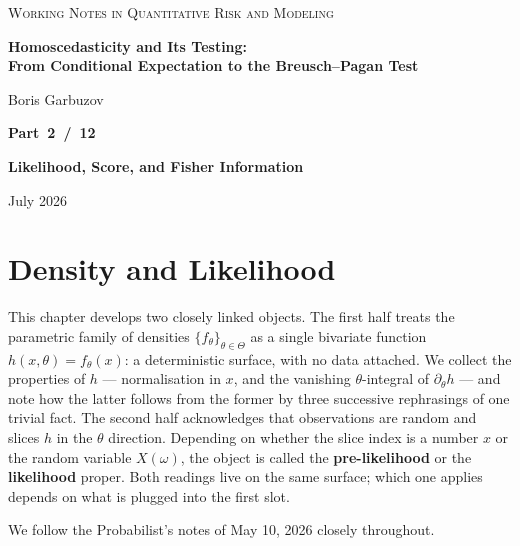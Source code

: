 \documentclass[a4paper,oneside,12pt]{extarticle}
\theoremstyle{plain}
\theoremstyle{definition}
\theoremstyle{remark}
\begin{document}
\begin{titlepage}
\begin{center}

{\footnotesize\scshape\color{gray}
Working Notes in Quantitative Risk and Modeling
}

\vfill

{\LARGE\bfseries Homoscedasticity and Its Testing:\\[4pt]
From Conditional Expectation to the Breusch--Pagan Test}

\vspace{36pt}

{\normalsize Boris Garbuzov}

\vfill

{\Large\bfseries Part~2~/~12}

\vspace{6pt}

{\Large\bfseries Likelihood, Score, and Fisher Information}

\vfill

{\small July 2026}

\end{center}
\end{titlepage}

\setcounter{tocdepth}{3}
\tableofcontents
\newpage
\section{Density and Likelihood}
\label{sec:density_and_likelihood}

This chapter develops two closely linked objects.  The first half
treats the parametric family of densities $\{f_\theta\}_{\theta\in\Theta}$
as a single bivariate function $h(x,\theta) = f_\theta(x)$: a
deterministic surface, with no data attached.  We collect the
properties of $h$ --- normalisation in $x$, and the vanishing
$\theta$-integral of $\partial_\theta h$ --- and note how the latter
follows from the former by three successive rephrasings of one trivial
fact.  The second half acknowledges that observations are random and
slices $h$ in the $\theta$ direction.  Depending on whether the slice
index is a number $x$ or the random variable $X(\omega)$, the object
is called the \textbf{pre-likelihood} or the \textbf{likelihood}
proper.  Both readings live on the same surface; which one applies
depends on what is plugged into the first slot.

We follow the Probabilist's notes of May 10, 2026 closely throughout.
\end{document}
